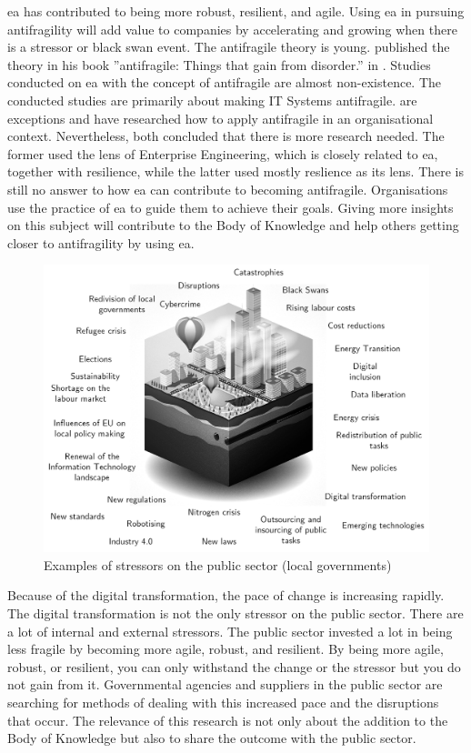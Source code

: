 \acrfull{ea} has contributed to being more \gls{robust}, \gls{resilient}, and \gls{agile}. Using \acrshort{ea} in pursuing \gls{antifragility} will add value to companies by accelerating and growing when there is a stressor or black swan event. The \gls{antifragile} theory is young.  \citeauthor{Taleb2012} published the theory in his book ''\Gls{antifragile}: Things that gain from disorder.'' in \citeyear{Taleb2012}.  Studies conducted on \acrshort{ea} with the concept of \gls{antifragile} are almost non-existence. The conducted studies are primarily about making IT Systems \gls{antifragile}. \textcite{Botjes2020,Kastner2017} are exceptions and have researched how to apply \gls{antifragile} in an organisational context. Nevertheless, both concluded that there is more research needed. The former used the lens of Enterprise Engineering, which is closely related to \acrshort{ea}, together with resilience, while the latter used mostly reslience as its lens. There is still no answer to how \acrshort{ea} can contribute to becoming \gls{antifragile}. Organisations use the practice of \acrshort{ea} to guide them to achieve their goals. Giving more insights on this subject will contribute to the Body of Knowledge and help others getting closer to \gls{antifragility} by using \acrshort{ea}.

\begin{figure}[H]
	\centering
	\includegraphics[width=0.8\linewidth]{images/publicstressors}
	\caption[Examples of stressors on the public sector (local governments)]{Examples of stressors on the public sector (local governments)}
	\label{fig:publicstressors}
\end{figure}

Because of the digital transformation, the pace of change is increasing rapidly.  The digital transformation is not the only stressor on the public sector. There are a lot of internal and external stressors. The public sector invested a lot in being less fragile by becoming more agile, robust, and resilient. By being more agile, robust, or resilient, you can only withstand the change or the stressor but you do not gain from it. Governmental agencies and suppliers in the public sector are searching for methods of dealing with this increased pace and the disruptions that occur. The relevance of this research is not only about the addition to the Body of Knowledge but also to share the outcome with the public sector.

